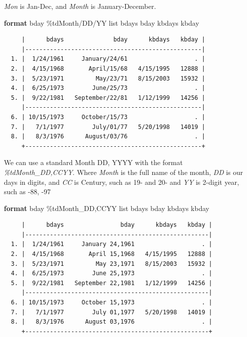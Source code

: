 \documentclass[
]{book}
\newenvironment{Shaded}{\begin{snugshade}}{\end{snugshade}}
\newcommand{\KeywordTok}[1]{\textcolor[rgb]{0.13,0.29,0.53}{\textbf{#1}}}
\newcommand{\NormalTok}[1]{#1}
\newcommand{\OtherTok}[1]{\textcolor[rgb]{0.56,0.35,0.01}{#1}}
\begin{document}
\emph{Mon} is Jan-Dec, and \emph{Month} is January-December.

\begin{Shaded}
\begin{Highlighting}[]
\KeywordTok{format}\NormalTok{ bday \%tdMonth/DD/YY }
\OtherTok{list}\NormalTok{ bdays bday kbdays kbday}
\end{Highlighting}
\end{Shaded}

\begin{verbatim}
     |      bdays              bday      kbdays   kbday |
     |--------------------------------------------------|
  1. |  1/24/1961     January/24/61                   . |
  2. |  4/15/1968       April/15/68   4/15/1995   12888 |
  3. |  5/23/1971         May/23/71   8/15/2003   15932 |
  4. |  6/25/1973        June/25/73                   . |
  5. |  9/22/1981   September/22/81   1/12/1999   14256 |
     |--------------------------------------------------|
  6. | 10/15/1973     October/15/73                   . |
  7. |   7/1/1977        July/01/77   5/20/1998   14019 |
  8. |   8/3/1976      August/03/76                   . |
     +--------------------------------------------------+
\end{verbatim}

We can use a standard Month DD, YYYY with the format \emph{\%tdMonth\_DD,CCYY}. Where \emph{Month} is the full name of the month, \emph{DD} is our days in digits, and \emph{CC} is Century, such as 19- and 20- and \emph{YY} is 2-digit year, such as -88, -97

\begin{Shaded}
\begin{Highlighting}[]
\KeywordTok{format}\NormalTok{ bday \%tdMonth\_DD,CCYY}
\OtherTok{list}\NormalTok{ bdays bday kbdays kbday}
\end{Highlighting}
\end{Shaded}

\begin{verbatim}
     |      bdays                bday      kbdays   kbday |
     |----------------------------------------------------|
  1. |  1/24/1961     January 24,1961                   . |
  2. |  4/15/1968       April 15,1968   4/15/1995   12888 |
  3. |  5/23/1971         May 23,1971   8/15/2003   15932 |
  4. |  6/25/1973        June 25,1973                   . |
  5. |  9/22/1981   September 22,1981   1/12/1999   14256 |
     |----------------------------------------------------|
  6. | 10/15/1973     October 15,1973                   . |
  7. |   7/1/1977        July 01,1977   5/20/1998   14019 |
  8. |   8/3/1976      August 03,1976                   . |
     +----------------------------------------------------+
\end{verbatim}
\end{document}

